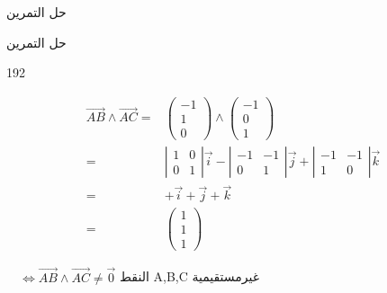 \begin{frame}[plain,label=sol3]{ حل التمرين} %
\begin{block}{حل التمرين} 
	\begin{dingautolist}{192}
		\item 
		\begin{align*}
		\overrightarrow{AB} \land \overrightarrow{AC} =&\begin{pmatrix}-1 \\1 \\ 0
		\end{pmatrix} \land \begin{pmatrix}-1 \\0 \\ 1
		\end{pmatrix}
		\\
		=& \left |\begin{array}{cc} 1&0\\0&1\end{array}\right |\vec{i}- \left |\begin{array}{cc} -1&-1\\0&1\end{array}\right |\vec{j}+ \left |\begin{array}{cc} -1&-1\\1&0\end{array}\right |\vec{k} \\
		=&+\vec{i}+\vec{j}+\vec{k} \\
		=&\begin{pmatrix}1 \\1\\ 1 \end{pmatrix}
		\end{align*}
		\item 
		$\quad \iff \overrightarrow{AB} \land \overrightarrow{AC} \neq \vec{0}  $
		النقط A,B,C غيرمستقيمية
	\end{dingautolist}
\hyperlink{ex3}{}
\hyperlink{}{}
\end{block}
\end{frame}


